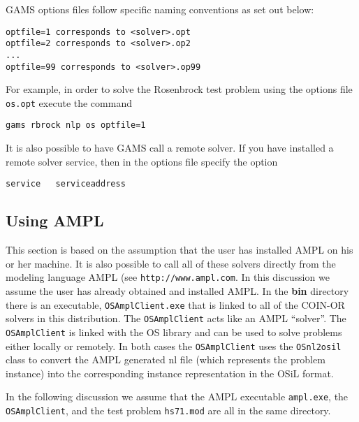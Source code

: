 \documentclass[11pt]{article}
\renewcommand{\{}{{\char"7B}}
\renewcommand{\}}{{\char"7D}}
\renewcommand{\^}{{\char"0D}}
\renewcommand{\'}{{\char"0D}}
\begin{document}
GAMS options files follow specific naming conventions as set out below:

\begin{verbatim}
optfile=1 corresponds to <solver>.opt
optfile=2 corresponds to <solver>.op2
...
optfile=99 corresponds to <solver>.op99
\end{verbatim}

For example, in order to solve the Rosenbrock test problem using the  options file  {\tt os.opt}
execute the command

\begin{verbatim}
gams rbrock nlp os optfile=1
\end{verbatim}


It is also possible to have GAMS call a remote solver. If you have installed a remote solver service, then in the options file specify the option

\begin{verbatim}
service   serviceaddress
\end{verbatim}



\subsection{Using AMPL}

This section is based on the assumption that the user has installed  AMPL  on his or her machine.   It is also possible to call all of these solvers directly from the modeling language AMPL 
(see {\tt http://www.ampl.com}.  In this discussion we assume the user has already obtained and 
installed AMPL.  In the {\bf bin} directory there is an executable, {\tt OSAmplClient.exe} 
that is linked to all of the COIN-OR solvers in this distribution.   The {\tt OSAmplClient} acts 
like an AMPL ``solver''. The {\tt OSAmplClient} is linked with the OS library and can be used 
to solve problems either locally or remotely. In both cases the {\tt OSAmplClient} uses the
{\tt OSnl2osil} class to convert the AMPL generated nl 
file (which represents the problem instance) into the corresponding 
instance representation in the OSiL format.

In the following discussion we assume that the AMPL executable {\tt ampl.exe}, the {\tt OSAmplClient}, 
and the test problem {\tt hs71.mod} are all in the same directory.  
\end{document}
